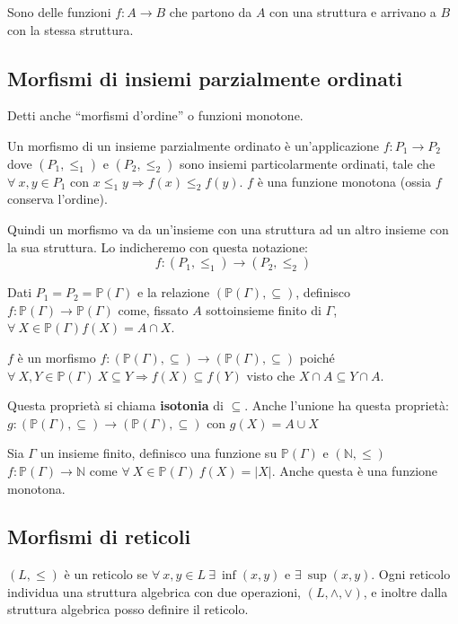 Sono delle funzioni $f : A \to B$ che partono da $A$ con una struttura e arrivano a $B$ con la stessa struttura.

\subsection{Morfismi di insiemi parzialmente ordinati}

Detti anche ``morfismi d'ordine'' o funzioni monotone. 
\begin{defn}
Un morfismo di un insieme parzialmente ordinato \`e un'applicazione $f : P_1 \to P_2$ dove $(P_1, \le_{1})$ e $(P_2, \le_{2})$ sono insiemi particolarmente ordinati, tale che $\forall \ x, y \in P_1$ con $x \le_1 y \Rightarrow f(x) \le_2 f(y)$. $f$ \`e una funzione monotona (ossia $f$ conserva l'ordine). 
\end{defn}
Quindi un morfismo va da un'insieme con una struttura ad un altro insieme con la sua struttura. Lo indicheremo con questa notazione:
\[
f : (P_1, \le_{1}) \to (P_2, \le_{2})
\]
\begin{exmp}
Dati $P_1 = P_2 = \mathbb{P}(\Gamma)$ e la relazione $(\mathbb{P}(\Gamma), \subseteq)$, definisco $f : \mathbb{P}(\Gamma) \to \mathbb{P}(\Gamma)$ come, fissato $A$ sottoinsieme finito di $\Gamma$, $\forall \ X \in \mathbb{P}(\Gamma) f(X) = A \cap X$.

$f$ \`e un morfismo $f : (\mathbb{P}(\Gamma), \subseteq) \to (\mathbb{P}(\Gamma), \subseteq)$ poich\'e $\forall \ X, Y \in \mathbb{P}(\Gamma) \ X \subseteq Y \Rightarrow f(X) \subseteq f(Y)$ visto che $X \cap A \subseteq Y \cap A$.
\end{exmp}
Questa propriet\`a si chiama \textbf{isotonia} di $\subseteq$. Anche l'unione ha questa propriet\`a: $g : (\mathbb{P}(\Gamma), \subseteq) \to (\mathbb{P}(\Gamma), \subseteq)$ con $g(X) = A \cup X$

\begin{exmp}
Sia $\Gamma$ un insieme finito, definisco una funzione su $\mathbb{P}(\Gamma)$ e $(\mathbb{N}, \le)$ $f : \mathbb{P}(\Gamma) \to \mathbb{N}$ come $\forall \ X \in \mathbb{P}(\Gamma) \ f(X) = |X|$. Anche questa \`e una funzione monotona.
\end{exmp}

\subsection{Morfismi di reticoli}

$(L, \le)$ \`e un reticolo se $\forall \ x, y \in L \ \exists \ \inf(x, y) $ e $ \exists \ \sup(x,y)$. Ogni reticolo individua una struttura algebrica con due operazioni, $(L, \wedge, \vee)$, e inoltre dalla struttura algebrica posso definire il reticolo.

